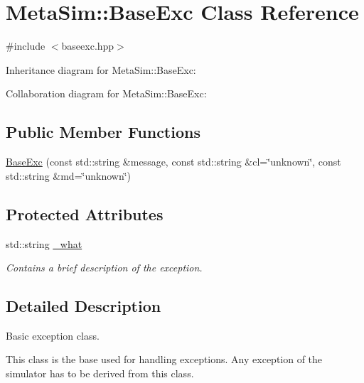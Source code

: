 \hypertarget{classMetaSim_1_1BaseExc}{}\section{Meta\+Sim\+:\+:Base\+Exc Class Reference}
\label{classMetaSim_1_1BaseExc}


{\ttfamily \#include $<$baseexc.\+hpp$>$}



Inheritance diagram for Meta\+Sim\+:\+:Base\+Exc\+:


Collaboration diagram for Meta\+Sim\+:\+:Base\+Exc\+:
\subsection*{Public Member Functions}
\begin{DoxyCompactItemize}
\item 
\hyperlink{classMetaSim_1_1BaseExc_af2a026f2bf16464914fb725e5046e4a5}{Base\+Exc} (const std\+::string \&message, const std\+::string \&cl=\char`\"{}unknown\char`\"{}, const std\+::string \&md=\char`\"{}unknown\char`\"{})
\end{DoxyCompactItemize}
\subsection*{Protected Attributes}
\begin{DoxyCompactItemize}
\item 
std\+::string \hyperlink{classMetaSim_1_1BaseExc_a363004526cd5f08def3d5fa5c259a10f}{\+\_\+what}\hypertarget{classMetaSim_1_1BaseExc_a363004526cd5f08def3d5fa5c259a10f}{}\label{classMetaSim_1_1BaseExc_a363004526cd5f08def3d5fa5c259a10f}

\begin{DoxyCompactList}\small\item\em Contains a brief description of the exception. \end{DoxyCompactList}\end{DoxyCompactItemize}


\subsection{Detailed Description}
Basic exception class.

This class is the base used for handling exceptions. Any exception of the simulator has to be derived from this class.

